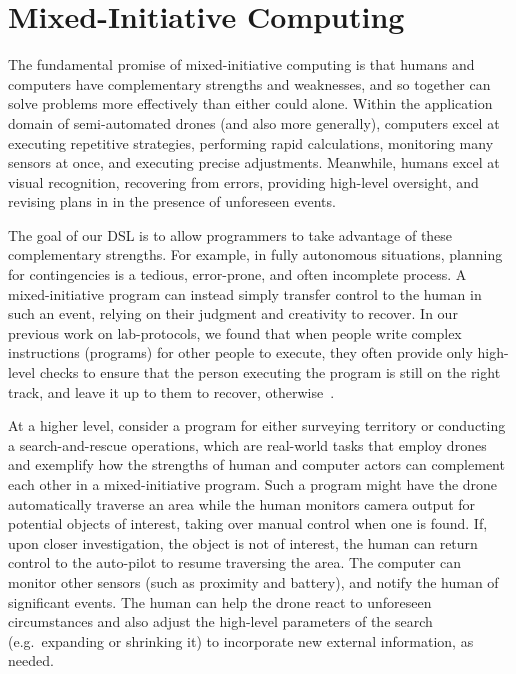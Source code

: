 \documentclass{sig-alternate-05-2015}
\begin{document}
\section{Mixed-Initiative Computing}
\label{sec:mic}

The fundamental promise of mixed-initiative computing is that humans and
computers have complementary strengths and weaknesses, and so together can
solve problems more effectively than either could alone.
%
Within the application domain of semi-automated drones (and also more
generally), computers excel at executing repetitive strategies, performing
rapid calculations, monitoring many sensors at once, and executing precise
adjustments. Meanwhile, humans excel at visual recognition, recovering from
errors, providing high-level oversight, and revising plans in in the presence
of unforeseen events.

The goal of our DSL is to allow programmers to take advantage of these
complementary strengths. For example, in fully autonomous situations, planning
for contingencies is a tedious, error-prone, and often incomplete process. A
mixed-initiative program can instead simply transfer control to the human in
such an event, relying on their judgment and creativity to recover.
%
In our previous work on lab-protocols, we found that when people write complex
instructions (programs) for other people to execute, they often provide only
high-level checks to ensure that the person executing the program is still on
the right track, and leave it up to them to recover,
otherwise~\cite{abbott2015prog}.

At a higher level, consider a program for either surveying territory or
conducting a search-and-rescue operations, which are real-world tasks that
employ drones and exemplify how the strengths of human and computer actors can
complement each other in a mixed-initiative program. Such a program might have
the drone automatically traverse an area while the human monitors camera output
for potential objects of interest, taking over manual control when one is
found. If, upon closer investigation, the object is not of interest, the human
can return control to the auto-pilot to resume traversing the area. The
computer can monitor other sensors (such as proximity and battery), and notify
the human of significant events. The human can help the drone react to
unforeseen circumstances and also adjust the high-level parameters of the
search (e.g.\ expanding or shrinking it) to incorporate new external
information, as needed.
\end{document}
